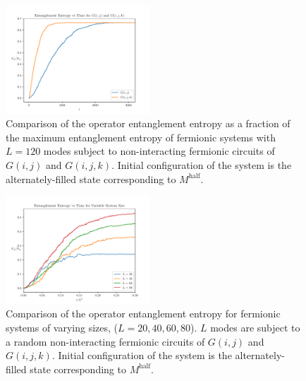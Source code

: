 \begin{figure}[h!]
    \centering
    \includegraphics[width=0.48\textwidth]{reportimages/GZFockState120.pdf}
    \caption{Comparison of the operator entanglement entropy as a fraction of the maximum entanglement entropy of fermionic systems with $L = 120$ modes subject to non-interacting fermionic circuits of $G(i, j)$ and $G(i, j, k)$. Initial configuration of the system is the alternately-filled state corresponding to $M^{\text{half}}$.}

    \label{comp}
\end{figure}

\begin{figure}[h!]
    \centering
    \includegraphics[width=0.48\textwidth]{reportimages/varysystem.pdf}
    \caption{Comparison of the operator entanglement entropy for fermionic systems of varying sizes, ($L = 20, 40, 60, 80$). $L$ modes are subject to a random non-interacting fermionic circuits of $G(i, j)$ and $G(i, j, k)$. Initial configuration of the system is the alternately-filled state corresponding to $M^{\text{half}}$.}

    \label{vary}
\end{figure}




